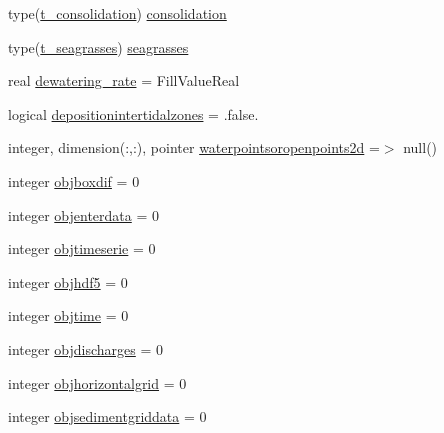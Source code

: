 \begin{DoxyCompactItemize}
\item 
type(\mbox{\hyperlink{structmoduleinterfacesedimentwater_1_1t__consolidation}{t\+\_\+consolidation}}) \mbox{\hyperlink{structmoduleinterfacesedimentwater_1_1t__interfacesedimentwater_af6c8d7be28d7d7713fa1a4649a5ee38d}{consolidation}}
\item 
type(\mbox{\hyperlink{structmoduleinterfacesedimentwater_1_1t__seagrasses}{t\+\_\+seagrasses}}) \mbox{\hyperlink{structmoduleinterfacesedimentwater_1_1t__interfacesedimentwater_ac586e6a42eb9c6e45122cc99ee6bfec1}{seagrasses}}
\item 
real \mbox{\hyperlink{structmoduleinterfacesedimentwater_1_1t__interfacesedimentwater_aaead1c3a9463b0a82a63d1929ff1bae2}{dewatering\+\_\+rate}} = Fill\+Value\+Real
\item 
logical \mbox{\hyperlink{structmoduleinterfacesedimentwater_1_1t__interfacesedimentwater_a8473c92990a5f4b2092ff107609f7280}{depositionintertidalzones}} = .false.
\item 
integer, dimension(\+:,\+:), pointer \mbox{\hyperlink{structmoduleinterfacesedimentwater_1_1t__interfacesedimentwater_a2b58367d48b104942dbd92b772e8dcc6}{waterpointsoropenpoints2d}} =$>$ null()
\item 
integer \mbox{\hyperlink{structmoduleinterfacesedimentwater_1_1t__interfacesedimentwater_a33c988a408bce9c27dc02bf83efab318}{objboxdif}} = 0
\item 
integer \mbox{\hyperlink{structmoduleinterfacesedimentwater_1_1t__interfacesedimentwater_a02d5be0fc4ab2e44d02145b6062682cd}{objenterdata}} = 0
\item 
integer \mbox{\hyperlink{structmoduleinterfacesedimentwater_1_1t__interfacesedimentwater_ac7222192d71312b2514d7c0be1bfdf59}{objtimeserie}} = 0
\item 
integer \mbox{\hyperlink{structmoduleinterfacesedimentwater_1_1t__interfacesedimentwater_ab456d187ed84775ccfcc04849e332988}{objhdf5}} = 0
\item 
integer \mbox{\hyperlink{structmoduleinterfacesedimentwater_1_1t__interfacesedimentwater_a7a130c292fcaf05b65329ab08f9809a3}{objtime}} = 0
\item 
integer \mbox{\hyperlink{structmoduleinterfacesedimentwater_1_1t__interfacesedimentwater_aec3c8b1d09af56322a373bc4bb4499f5}{objdischarges}} = 0
\item 
integer \mbox{\hyperlink{structmoduleinterfacesedimentwater_1_1t__interfacesedimentwater_a431e81e850e84728c86113c0ca58cd4e}{objhorizontalgrid}} = 0
\item 
integer \mbox{\hyperlink{structmoduleinterfacesedimentwater_1_1t__interfacesedimentwater_a39592fa9d959d056a4a2cf01bcaa6753}{objsedimentgriddata}} = 0

\end{DoxyCompactItemize}
